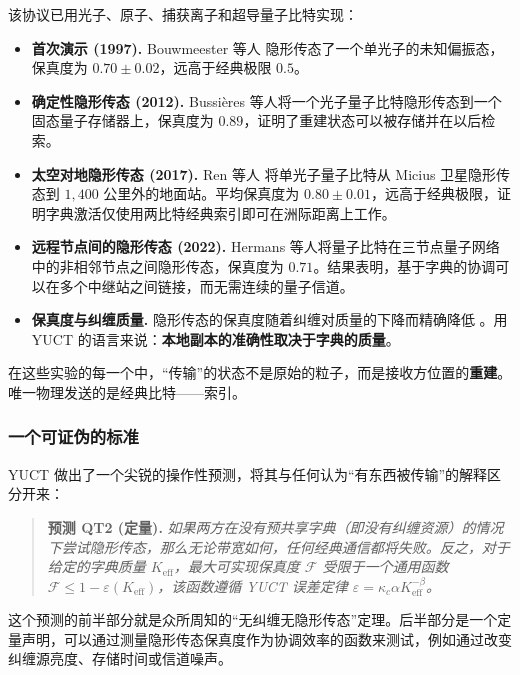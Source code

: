 \documentclass[12pt,a4paper]{article}
\theoremstyle{remark}
\begin{document}
	该协议已用光子、原子、捕获离子和超导量子比特实现：
	
	\begin{itemize}
		\item \textbf{首次演示 (1997).} Bouwmeester 等人 \cite{Bouwmeester1997} 隐形传态了一个单光子的未知偏振态，保真度为 $0.70 \pm 0.02$，远高于经典极限 $0.5$。
		\item \textbf{确定性隐形传态 (2012).} Bussi\`eres 等人将一个光子量子比特隐形传态到一个固态量子存储器上，保真度为 $0.89$，证明了重建状态可以被存储并在以后检索。
		\item \textbf{太空对地隐形传态 (2017).} Ren 等人 \cite{Ren2017} 将单光子量子比特从 Micius 卫星隐形传态到 $1,400$ 公里外的地面站。平均保真度为 $0.80 \pm 0.01$，远高于经典极限，证明字典激活仅使用两比特经典索引即可在洲际距离上工作。
		\item \textbf{远程节点间的隐形传态 (2022).} Hermans 等人将量子比特在三节点量子网络中的非相邻节点之间隐形传态，保真度为 $0.71$。结果表明，基于字典的协调可以在多个中继站之间链接，而无需连续的量子信道。
		\item \textbf{保真度与纠缠质量.} 隐形传态的保真度随着纠缠对质量的下降而精确降低 \cite{Knill2005}。用 YUCT 的语言来说：\textbf{本地副本的准确性取决于字典的质量}。
	\end{itemize}
	
	在这些实验的每一个中，“传输”的状态不是原始的粒子，而是接收方位置的\textbf{重建}。唯一物理发送的是经典比特——索引。
	
	\subsubsection{一个可证伪的标准}
	
	YUCT 做出了一个尖锐的操作性预测，将其与任何认为“有东西被传输”的解释区分开来：
	
	\begin{quote}
		\textbf{预测 QT2 (定量).} \emph{如果两方在没有预共享字典（即没有纠缠资源）的情况下尝试隐形传态，那么无论带宽如何，任何经典通信都将失败。反之，对于给定的字典质量 $K_{\mathrm{eff}}$，最大可实现保真度 $\mathcal{F}$ 受限于一个通用函数 $\mathcal{F} \le 1 - \varepsilon(K_{\mathrm{eff}})$，该函数遵循 YUCT 误差定律 $\varepsilon = \kappa_c \alpha K_{\mathrm{eff}}^{-\beta}$。}
	\end{quote}
	
	这个预测的前半部分就是众所周知的“无纠缠无隐形传态”定理。后半部分是一个定量声明，可以通过测量隐形传态保真度作为协调效率的函数来测试，例如通过改变纠缠源亮度、存储时间或信道噪声。
	
\end{document}
